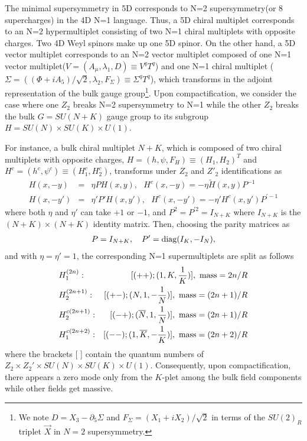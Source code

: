 \documentclass[a4paper,12pt]{article}
\begin{document}
The minimal supersymmetry in 5D
corresponds to N=2 supersymmetry(or 8 supercharges)
in the 4D N=1 language.
Thus, a 5D chiral multiplet corresponds to an N=2 hypermultiplet consisting
of two N=1 chiral multiplets with opposite charges. Two 4D Weyl spinors make
up one 5D spinor. On the other hand,
a 5D vector multiplet corresponds to an N=2 vector multiplet composed of one
N=1 vector multiplet($V=(A_\mu,\lambda_1, D)\equiv V^q T^q$)
and one N=1 chiral multiplet
($\Sigma=((\Phi+iA_5)/\sqrt{2}, \lambda_2,F_\Sigma)\equiv \Sigma^q T^q$), 
which transforms in the adjoint representation of the bulk gauge 
group\footnote{We note $D=X_3-\partial_5\Sigma$ and 
$F_\Sigma=(X_1+iX_2)/\sqrt{2}$ 
in terms of the $SU(2)_R$ triplet $\vec X$ in $N=2$ supersymmetry.}.
Upon compactification, we consider the case
where one $Z_2$ breaks N=2 supersymmetry to N=1
while the other $Z_2$ breaks the bulk $G=SU(N+K)$ gauge group
to its subgroup $H=SU(N)\times SU(K)\times U(1)$.

For instance, a bulk chiral multiplet
$N+K$, which is composed of two chiral multiplets with opposite charges,
$H=(h,\psi, F_H)\equiv (H_1,H_2)^T$
and $H^c=(h^c,\psi^c)\equiv (H^c_1, H^c_2)$,
transforms under $Z_2$ and $Z'_2$ identifications as
\begin{eqnarray}
H(x,-y)&=&\eta P H(x,y), \ \ \ H^c(x,-y)=- \eta {\tilde H}(x,y)P^{-1} \\
H(x,-y')&=&\eta' P' H(x,y'), \ \ \ H^c(x,-y')=-\eta'H^c(x,y') P^{\prime -1}
\end{eqnarray}
where both $\eta$ and $\eta'$ can take $+1$ or $-1$, and 
$P^2=P^{\prime 2}=I_{N+K}$ where $I_{N+K}$ is the $(N+K)\times (N+K)$ 
identity matrix. 
Then, choosing the parity matrices as
\begin{eqnarray}
P= I_{N+K}, \ \ \ P'={\rm diag}(I_{K},-I_{N}),\label{parity}
\label{parity}
\end{eqnarray}
and with $\eta=\eta'=1$,
the corresponding N=1 supermultiplets are split as follows
\begin{eqnarray}
&H_1^{(2n)}:&[(++);(1,K,\frac{1}{K})],\ {\rm mass}=2n/R \\
&H_2^{(2n+1)}:&[(+-);(N,1,-\frac{1}{N})],
\ {\rm mass}=(2n+1)/R \\
&H_2^{c(2n+1)}:& [(-+);(\overline {N},1,\frac{1}{N})],
\ {\rm mass}=(2n+1)/R \\
&H_1^{c(2n+2)}:&
[(--);(1,\overline{K},-\frac{1}{K})],\ {\rm mass}=(2n+2)/R
\end{eqnarray}
where the brackets [ ] contain the quantum numbers of $Z_2\times
Z_2'\times SU(N)\times SU(K)\times U(1)$. Consequently,
upon compactification, there appears
a zero mode only from the $K$-plet among the bulk field components while
other fields get massive.
\end{document}
